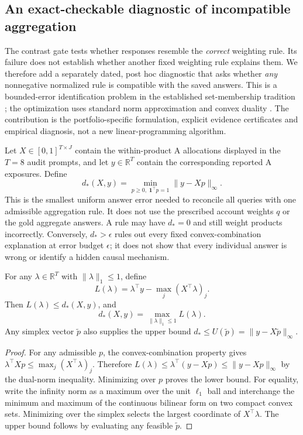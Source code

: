 \subsection{An exact-checkable diagnostic of incompatible aggregation}\label{sec:certificate}
The contrast gate tests whether responses resemble the \emph{correct} weighting rule. Its failure does not establish whether another fixed weighting rule explains them. We therefore add a separately dated, post hoc diagnostic that asks whether \emph{any} nonnegative normalized rule is compatible with the saved answers. This is a bounded-error identification problem in the established set-membership tradition \citep{milanese1991}; the optimization uses standard norm approximation and convex duality \citep{boyd2004}. The contribution is the portfolio-specific formulation, explicit evidence certificates and empirical diagnosis, not a new linear-programming algorithm.

Let $X\in[0,1]^{T\times J}$ contain the within-product A allocations displayed in the $T=8$ audit prompts, and let $y\in\mathbb R^T$ contain the corresponding reported A exposures. Define
\begin{equation}
 d_*(X,y)=\min_{p\geq0,\;\mathbf1^\top p=1}\|y-Xp\|_\infty.\label{eq:mindefect}
\end{equation}
This is the smallest uniform answer error needed to reconcile all queries with one admissible aggregation rule. It does not use the prescribed account weights $q$ or the gold aggregate answers. A rule may have $d_*=0$ and still weight products incorrectly. Conversely, $d_*>\epsilon$ rules out every fixed convex-combination explanation at error budget $\epsilon$; it does not show that every individual answer is wrong or identify a hidden causal mechanism.

\begin{proposition}\label{prop:certificate}
For any $\lambda\in\mathbb R^T$ with $\|\lambda\|_1\leq1$, define
\begin{equation}
 L(\lambda)=\lambda^\top y-\max_j(X^\top\lambda)_j.
\end{equation}
Then $L(\lambda)\leq d_*(X,y)$, and
\begin{equation}
 d_*(X,y)=\max_{\|\lambda\|_1\leq1}L(\lambda).
\end{equation}
Any simplex vector $\widetilde p$ also supplies the upper bound
$d_*\leq U(\widetilde p)=\|y-X\widetilde p\|_\infty$.
\end{proposition}
\begin{proof}
For any admissible $p$, the convex-combination property gives
$\lambda^\top Xp\leq\max_j(X^\top\lambda)_j$. Therefore
$L(\lambda)\leq\lambda^\top(y-Xp)\leq\|y-Xp\|_\infty$ by the dual-norm inequality. Minimizing over $p$ proves the lower bound. For equality, write the infinity norm as a maximum over the unit $\ell_1$ ball and interchange the minimum and maximum of the continuous bilinear form on two compact convex sets. Minimizing over the simplex selects the largest coordinate of $X^\top\lambda$. The upper bound follows by evaluating any feasible $\widetilde p$.
\end{proof}

